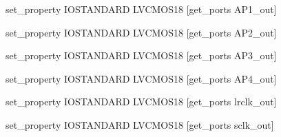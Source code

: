 set\_property IOSTANDARD LVCMOS18 [get\_ports AP1\_out]

set\_property IOSTANDARD LVCMOS18 [get\_ports AP2\_out]

set\_property IOSTANDARD LVCMOS18 [get\_ports AP3\_out]

set\_property IOSTANDARD LVCMOS18 [get\_ports AP4\_out]

set\_property IOSTANDARD LVCMOS18 [get\_ports lrclk\_out]

set\_property IOSTANDARD LVCMOS18 [get\_ports sclk\_out]



%




